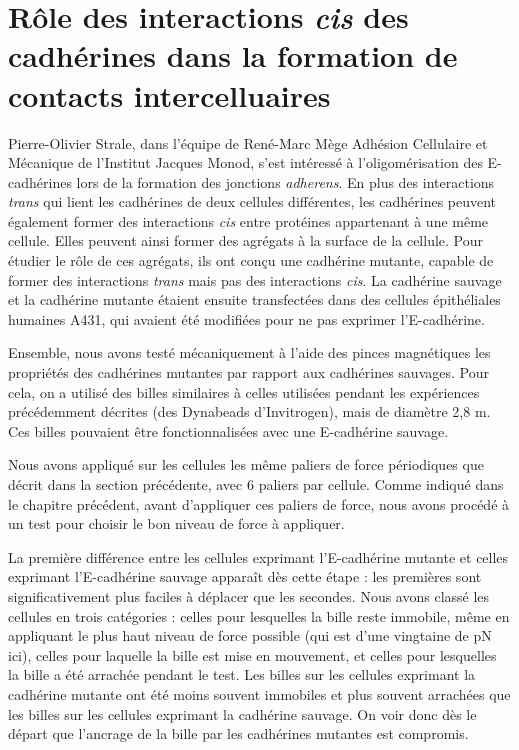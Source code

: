  
 \section{Rôle des interactions \textit{cis} des cadhérines dans la formation de contacts intercelluaires}
 
 Pierre-Olivier Strale, dans l'équipe de René-Marc Mège Adhésion Cellulaire et Mécanique de l'Institut Jacques Monod, s'est intéressé à l'oligomérisation des E-cadhérines lors de la formation des jonctions \textit{adherens}. En plus des interactions \textit{trans} qui lient les cadhérines de deux cellules différentes, les cadhérines peuvent également former des interactions \textit{cis} entre protéines appartenant à une même cellule. Elles peuvent ainsi former des agrégats à la surface de la cellule. Pour étudier le rôle de ces agrégats, ils ont conçu une cadhérine mutante, capable de former des interactions \textit{trans} mais pas des interactions \textit{cis}. La cadhérine sauvage et la cadhérine mutante étaient ensuite transfectées dans des cellules épithéliales humaines A431, qui avaient été modifiées pour ne pas exprimer l'E-cadhérine.  
 
 Ensemble, nous avons testé mécaniquement à l'aide des pinces magnétiques les propriétés des cadhérines mutantes par rapport aux cadhérines sauvages. Pour cela, on a utilisé des billes similaires à celles utilisées pendant les expériences précédemment décrites (des Dynabeads d'Invitrogen), mais de diamètre 2,8 \micro m. Ces billes pouvaient être fonctionnalisées avec une E-cadhérine sauvage. 
 
 Nous avons appliqué sur les cellules les même paliers de force périodiques que décrit dans la section précédente, avec 6 paliers par cellule. Comme indiqué dans le chapitre précédent, avant d'appliquer ces paliers de force, nous avons procédé à un test pour choisir le bon niveau de force à appliquer. 
 
 La première différence entre les cellules exprimant l'E-cadhérine mutante et celles exprimant l'E-cadhérine sauvage apparaît dès cette étape : les premières  sont significativement plus faciles à déplacer que les secondes. Nous avons classé les cellules en trois catégories : celles pour lesquelles la bille reste immobile, même en appliquant le plus haut niveau de force possible (qui est d'une vingtaine de pN ici), celles pour laquelle la bille est mise en mouvement, et celles pour lesquelles la bille a été arrachée pendant le test. Les billes sur les cellules exprimant la cadhérine mutante ont été moins souvent immobiles et plus souvent arrachées que les billes sur les cellules exprimant la cadhérine sauvage. On voir donc dès le départ que l'ancrage de la bille par les cadhérines mutantes est compromis. 
 
